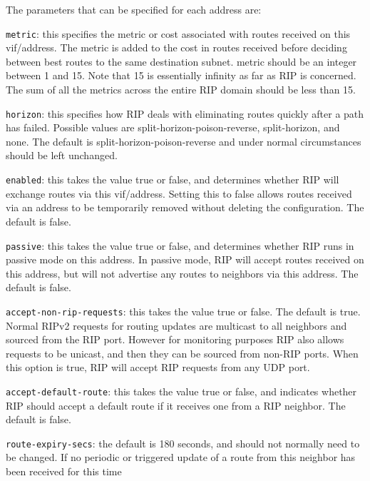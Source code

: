 \begin{description}
  The parameters that can be specified for each address are:
\begin{description}
\item{\tt metric}: this specifies the metric or cost associated with
  routes received on this vif/address.  The metric is added to the
  cost in routes received before deciding between best routes to the
  same destination subnet.  {\stt metric} should be an integer between
  1 and 15.  Note that 15 is essentially infinity as far as RIP is
  concerned.  The sum of all the metrics across the entire RIP domain
  should be less than 15.
\item{\tt horizon}: this specifies how RIP deals with eliminating
  routes quickly after a path has failed.  Possible values are {\stt
  split-horizon-poison-reverse}, {\stt split-horizon}, and {\stt
  none}.  The default is {\stt split-horizon-poison-reverse} and under
  normal circumstances should be left unchanged.
\item{\tt enabled}: this takes the value {\stt true} or {\stt false},
  and determines whether RIP will exchange routes via this
  vif/address.  Setting this to false allows routes received via an
  address to be temporarily removed without deleting the
  configuration.  The default is {\stt false}.
\item{\tt passive}: this takes the value {\stt true} or {\stt false},
  and determines whether RIP runs in passive mode on this address.  In
  passive mode, RIP will accept routes received on this address, but
  will not advertise any routes to neighbors via this address.  The
  default is {\stt false}.
\item{\tt accept-non-rip-requests}: this takes the value {\stt true}
  or {\stt false}.  The default is {\stt true}.  Normal RIPv2 requests
  for routing updates are multicast to all neighbors and sourced from
  the RIP port.  However for monitoring purposes RIP also allows
  requests to be unicast, and then they can be sourced from non-RIP
  ports.  When this option is {\stt true}, RIP will accept RIP
  requests from any UDP port.
\item{\tt accept-default-route}: this takes the value {\stt true} or
  {\stt false}, and indicates whether RIP should accept a default
  route if it receives one from a RIP neighbor.  The default is {\stt
  false}.
\item{\tt route-expiry-secs}: the default is 180 seconds, and should
  not normally need to be changed.  If no periodic or triggered update
  of a route from this neighbor has been received for this time

\end{description}
\end{description}
